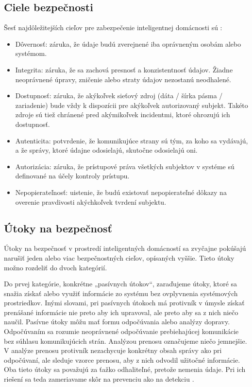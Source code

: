 \documentclass[twoside]{ctuthesis}
\theoremstyle{plain}
\theoremstyle{definition}
\theoremstyle{note}
\begin{document}
\subsection{Ciele bezpečnosti}
Šesť najdôležitejších cieľov pre zabezpečenie inteligentnej domácnosti sú \cite{security}:
\begin{itemize}
\item Dôvernosť: záruka, že údaje budú zverejnené iba oprávneným osobám alebo systémom.
\item Integrita: záruka, že sa zachová presnosť a konzistentnosť údajov. Žiadne neoprávnené úpravy, zničenie alebo straty údajov nezostanú neodhalené.
\item Dostupnosť: záruka, že akýkoľvek sieťový zdroj (dáta / šírka pásma / zariadenie) bude vždy k dispozícii pre akýkoľvek autorizovaný subjekt. Takéto zdroje sú tiež chránené pred akýmikoľvek incidentmi, ktoré ohrozujú ich dostupnosť.
\item Autenticita: potvrdenie, že komunikujúce strany sú tým, za koho sa vydávajú, a že správy, ktoré údajne odosielajú, skutočne odosielajú oni.
\item Autorizácia: záruka, že prístupové práva všetkých subjektov v systéme sú definované na účely kontroly prístupu.
\item Nepopierateľnosť: uistenie, že budú existovať nepopierateľné dôkazy na overenie pravdivosti akýchkoľvek tvrdení subjektu.
\end{itemize}


\subsection{Útoky na bezpečnosť}
Útoky na bezpečnosť v prostredí inteligentných domácností sa zvyčajne pokúšajú narušiť jeden alebo viac bezpečnostných cieľov, opísaných vyššie. Tieto útoky možno rozdeliť do dvoch kategórií.
\newline

Do prvej kategórie, konkrétne „pasívnych útokov“, zaraďujeme útoky, ktoré sa snažia získať alebo využiť informácie zo systému bez ovplyvnenia systémových prostriedkov. Inými slovami, pri pasívnych útokoch má protivník v úmysle získať prenášané informácie nie preto aby ich upravoval, ale preto aby sa z nich niečo naučil. Pasívne útoky môžu mať formu odpočúvania alebo analýzy dopravy. Odpočúvaním sa rozumie neoprávnené odpočúvanie prebiehajúcej komunikácie bez súhlasu komunikujúcich strán. Analýzou prenosu označujeme niečo jemnejšie. V analýze prenosu protivník nezachycuje konkrétny obsah správy ako pri odpočúvaní, ale sleduje vzorce prenosu, aby z nich odvodil užitočné informácie. Oba tieto útoky sa považujú za ťažko odhaliteľné, pretože nemenia údaje. Pri ich riešení sa teda zameriavame skôr na prevenciu ako na detekciu  \cite{security}.
\newline
\end{document}
